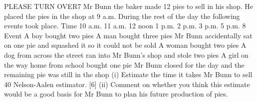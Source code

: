 \documentclass[a4paper,12pt]{article}
\begin{document}
\begin{enumerate}
PLEASE TURN OVER7
Mr Bunn the baker made 12 pies to sell in his shop. He placed the pies in the shop at
9 a.m. During the rest of the day the following events took place.
Time
10 a.m.
11 a.m.
12 noon
1 p.m.
2 p.m.
3 p.m.
5 p.m.
8
Event
A boy bought two pies
A man bought three pies
Mr Bunn accidentally sat on one pie and squashed it so it could not be
sold
A woman bought two pies
A dog from across the street ran into Mr Bunn’s shop and stole two
pies
A girl on the way home from school bought one pie
Mr Bunn closed for the day and the remaining pie was still in the shop
(i) Estimate the time it takes Mr Bunn to sell 40%
Nelson-Aalen estimator.
[6]
(ii) Comment on whether you think this estimate would be a good basis for Mr
Bunn to plan his future production of pies.





\end{enumerate}
\end{document}
